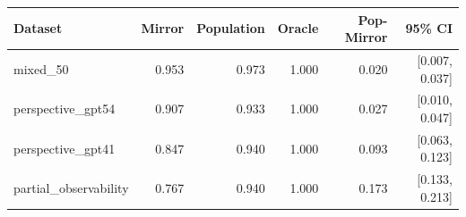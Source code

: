\begin{tabular}{lrrrrr}
\toprule
Dataset & Mirror & Population & Oracle & Pop-Mirror & 95\% CI \\
\midrule
mixed\_50 & 0.953 & 0.973 & 1.000 & 0.020 & [0.007, 0.037] \\
perspective\_gpt54 & 0.907 & 0.933 & 1.000 & 0.027 & [0.010, 0.047] \\
perspective\_gpt41 & 0.847 & 0.940 & 1.000 & 0.093 & [0.063, 0.123] \\
partial\_observability & 0.767 & 0.940 & 1.000 & 0.173 & [0.133, 0.213] \\
\bottomrule
\end{tabular}
